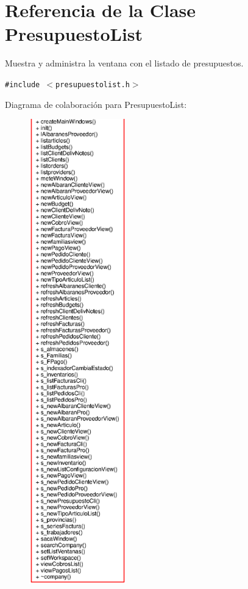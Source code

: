 \section{Referencia de la Clase Presupuesto\-List}
\label{classPresupuestoList}
Muestra y administra la ventana con el listado de presupuestos.  


{\tt \#include $<$presupuestolist.h$>$}

Diagrama de colaboraci\'{o}n para Presupuesto\-List:\begin{figure}[H]
\begin{center}
\leavevmode
\includegraphics[width=119pt]{classPresupuestoList__coll__graph}
\end{center}
\end{figure}
